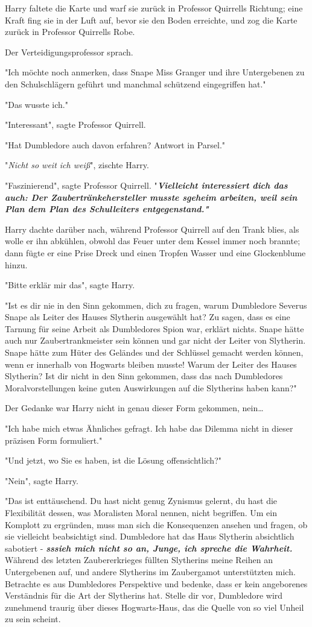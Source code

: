 {Harry faltete die Karte und warf sie zurück in Professor Quirrells Richtung; eine Kraft fing sie in der Luft auf, bevor sie den Boden erreichte, und zog die Karte zurück in Professor Quirrells Robe.

Der Verteidigungsprofessor sprach.

"Ich möchte noch anmerken, dass Snape Miss Granger und ihre Untergebenen zu den Schulschlägern geführt und manchmal schützend eingegriffen hat."

"Das wusste ich."

"Interessant", sagte Professor Quirrell.

"Hat Dumbledore auch davon erfahren? Antwort in Parsel."

"\emph{Nicht so weit ich weiß}", zischte Harry.

"Faszinierend", sagte Professor Quirrell. "\textbf{\emph{Vielleicht interessiert dich das auch: Der Zaubertränkehersteller musste sgeheim arbeiten, weil sein Plan dem Plan des Schulleiters entgegenstand."}}

Harry dachte darüber nach, während Professor Quirrell auf den Trank blies, als wolle er ihn abkühlen, obwohl das Feuer unter dem Kessel immer noch brannte; dann fügte er eine Prise Dreck und einen Tropfen Wasser und eine Glockenblume hinzu.

"Bitte erklär mir das", sagte Harry.

"Ist es dir nie in den Sinn gekommen, dich zu fragen, warum Dumbledore Severus Snape als Leiter des Hauses Slytherin ausgewählt hat? Zu sagen, dass es eine Tarnung für seine Arbeit als Dumbledores Spion war, erklärt nichts. Snape hätte auch nur Zaubertrankmeister sein können und gar nicht der Leiter von Slytherin. Snape hätte zum Hüter des Geländes und der Schlüssel gemacht werden können, wenn er innerhalb von Hogwarts bleiben musste! Warum der Leiter des Hauses Slytherin? Ist dir nicht in den Sinn gekommen, dass das nach Dumbledores Moralvorstellungen keine guten Auswirkungen auf die Slytherins haben kann?"

Der Gedanke war Harry nicht in genau dieser Form gekommen, nein…

"Ich habe mich etwas Ähnliches gefragt. Ich habe das Dilemma nicht in dieser präzisen Form formuliert."

"Und jetzt, wo Sie es haben, ist die Lösung offensichtlich?"

"Nein", sagte Harry.

"Das ist enttäuschend. Du hast nicht genug Zynismus gelernt, du hast die Flexibilität dessen, was Moralisten Moral nennen, nicht begriffen. Um ein Komplott zu ergründen, muss man sich die Konsequenzen ansehen und fragen, ob sie vielleicht beabsichtigt sind. Dumbledore hat das Haus Slytherin absichtlich sabotiert - \textbf{\emph{sssieh mich nicht so an, Junge, ich spreche die Wahrheit.}} Während des letzten Zaubererkrieges füllten Slytherins meine Reihen an Untergebenen auf, und andere Slytherins im Zaubergamot unterstützten mich. Betrachte es aus Dumbledores Perspektive und bedenke, dass er kein angeborenes Verständnis für die Art der Slytherins hat. Stelle dir vor, Dumbledore wird zunehmend traurig über dieses Hogwarts-Haus, das die Quelle von so viel Unheil zu sein scheint.

}
